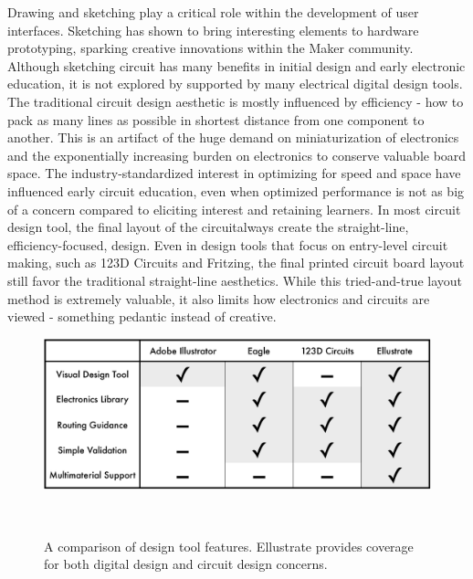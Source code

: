 \documentclass{sigchi}
\begin{document}
Drawing and sketching play a critical role within the development of user interfaces. Sketching has shown to bring interesting elements to hardware prototyping, sparking creative innovations within the Maker community. Although sketching circuit has many benefits in initial design and early electronic education, it is not explored by supported by many electrical digital design tools. The traditional circuit design aesthetic is mostly influenced by efficiency - how to pack as many lines as possible in shortest distance from one component to another. This is an artifact of the huge demand on miniaturization of electronics and the exponentially increasing burden on electronics to conserve valuable board space. The industry-standardized interest in optimizing for speed and space have influenced early circuit education, even when optimized performance is not as big of a concern compared to eliciting interest and retaining learners. In most circuit design tool, the final layout of the circuitalways create the straight-line, efficiency-focused, design. Even in design tools that focus on entry-level circuit making, such as 123D Circuits and Fritzing, the  final printed circuit board layout still favor the traditional straight-line aesthetics. While this tried-and-true layout method is extremely valuable, it also limits how electronics and circuits are viewed - something pedantic instead of creative.

\begin{figure}[t]
\centering
  \includegraphics[width=1\columnwidth]{figures/comparative_table.pdf}
  \caption{A comparison of design tool features. Ellustrate provides coverage for both digital design and circuit design concerns. }~\label{fig:comparison_table}
  \vspace{-16pt}
\end{figure}
\end{document}
